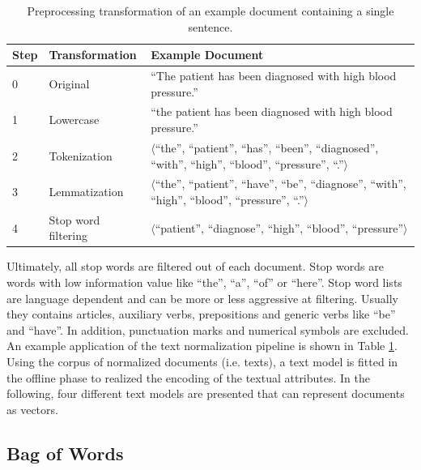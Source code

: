 \begin{table}[!htbp]
	\begin{tabularx}{\textwidth}{l l p{9.8cm}}
		\toprule
		\textbf{Step} & \textbf{Transformation} & \textbf{Example Document}                                                       \\ \midrule
		0             & Original       &   \enquote{The patient has been diagnosed with high blood pressure.} \\
		1             & Lowercase               &   \enquote{the patient has been diagnosed with high blood pressure.} \\
		2 & Tokenization  & $\langle$\enquote{the}, \enquote{patient}, \enquote{has}, \enquote{been}, \enquote{diagnosed}, \enquote{with}, \enquote{high}, \enquote{blood}, \enquote{pressure}, \enquote{.}$\rangle$ \\
		3 & Lemmatization & $\langle$\enquote{the}, \enquote{patient}, \enquote{have},  \enquote{be}, \enquote{diagnose}, \enquote{with},  \enquote{high}, \enquote{blood}, \enquote{pressure}, \enquote{.}$\rangle$  \\
		4             & Stop word filtering     & $\langle$\enquote{patient}, \enquote{diagnose}, \enquote{high}, \enquote{blood}, \enquote{pressure}$\rangle$ \\ \bottomrule
	\end{tabularx}
	\caption[Preprocessing transformation of an example document]{Preprocessing transformation of an example document containing a single sentence.}
	\label{tab:text-preprocessing}
\end{table}

Ultimately, all stop words are filtered out of each document.
Stop words are words with low information value like  \enquote{the},  \enquote{a},  \enquote{of} or  \enquote{here}.
Stop word lists are language dependent and can be more or less aggressive at filtering.
Usually they contains articles, auxiliary verbs, prepositions and generic verbs like  \enquote{be} and  \enquote{have}.
In addition, punctuation marks and numerical symbols are excluded.
An example application of the text normalization pipeline is shown in Table \ref{tab:text-preprocessing}.
Using the corpus of normalized documents (i.e. texts), a text model is fitted in the offline phase to realized the encoding of the textual attributes.
In the following, four different text models are presented that can represent documents as vectors.

\subsection{Bag of Words}\label{sec:bow}

